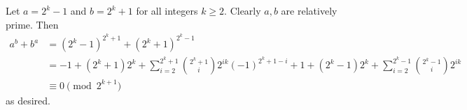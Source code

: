 Let $a=2^k-1$ and $b=2^k+1$ for all integers $k\geq2$. Clearly $a,b$ are relatively prime. Then
\begin{align*}
	a^b+b^a&=(2^k-1)^{2^k+1}+(2^k+1)^{2^k-1}\\
	&=-1+(2^k+1)2^k+\displaystyle\sum_{i=2}^{2^k+1}\binom{2^k+1}{i}2^{ik}(-1)^{2^k+1-i}+1+(2^k-1)2^k+\displaystyle\sum_{i=2}^{2^k-1}\binom{2^k-1}{i}2^{ik}\\
	&\equiv0\pmod{2^{k+1}}
\end{align*}
as desired.
